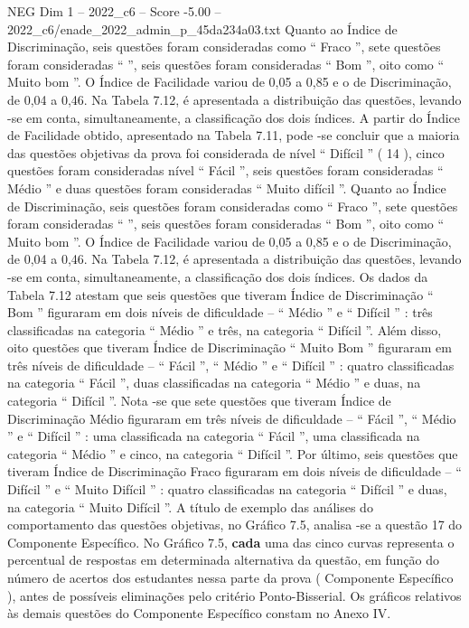 \begin{textsample}{NEG Dim 1 – 2022\_c6 – Score -5.00 – 2022\_c6/enade\_2022\_admin\_p\_45da234a03.txt}
Quanto ao Índice de Discriminação, seis questões foram consideradas como “ Fraco ”, sete questões foram consideradas “ ”, seis questões foram consideradas “ Bom ”, oito como “ Muito bom ”.
O Índice de Facilidade variou de 0,05 a 0,85 e o de Discriminação, de 0,04 a 0,46.
Na Tabela 7.12, é apresentada a distribuição das questões, levando -se em conta, simultaneamente, a classificação dos dois índices.
A partir do Índice de Facilidade obtido, apresentado na Tabela 7.11, pode -se concluir que a maioria das questões objetivas da prova foi considerada de nível “ Difícil ” ( 14 ), cinco questões foram consideradas nível “ Fácil ”, seis questões foram consideradas “ Médio ” e duas questões foram consideradas “ Muito difícil ”.
Quanto ao Índice de Discriminação, seis questões foram consideradas como “ Fraco ”, sete questões foram consideradas “ ”, seis questões foram consideradas “ Bom ”, oito como “ Muito bom ”.
O Índice de Facilidade variou de 0,05 a 0,85 e o de Discriminação, de 0,04 a 0,46.
Na Tabela 7.12, é apresentada a distribuição das questões, levando -se em conta, simultaneamente, a classificação dos dois índices.
Os dados da Tabela 7.12 atestam que seis questões que tiveram Índice de Discriminação “ Bom ” figuraram em dois níveis de dificuldade – “ Médio ” e “ Difícil ” : três classificadas na categoria “ Médio ” e três, na categoria “ Difícil ”.
Além disso, oito questões que tiveram Índice de Discriminação “ Muito Bom ” figuraram em três níveis de dificuldade – “ Fácil ”, “ Médio ” e “ Difícil ” : quatro classificadas na categoria “ Fácil ”, duas classificadas na categoria “ Médio ” e duas, na categoria “ Difícil ”.
Nota -se que sete questões que tiveram Índice de Discriminação Médio figuraram em três níveis de dificuldade – “ Fácil ”, “ Médio ” e “ Difícil ” : uma classificada na categoria “ Fácil ”, uma classificada na categoria “ Médio ” e cinco, na categoria “ Difícil ”.
Por último, seis questões que tiveram Índice de Discriminação Fraco figuraram em dois níveis de dificuldade – “ Difícil ” e “ Muito Difícil ” : quatro classificadas na categoria “ Difícil ” e duas, na categoria “ Muito Difícil ”.
A título de exemplo das análises do comportamento das questões objetivas, no Gráfico 7.5, analisa -se a questão 17 do Componente Específico.
No Gráfico 7.5, \textbf{cada} uma das cinco curvas representa o percentual de respostas em determinada alternativa da questão, em função do número de acertos dos estudantes nessa parte da prova ( Componente Específico ), antes de possíveis eliminações pelo critério Ponto-Bisserial.
Os gráficos relativos às demais questões do Componente Específico constam no Anexo IV.

\end{textsample}
